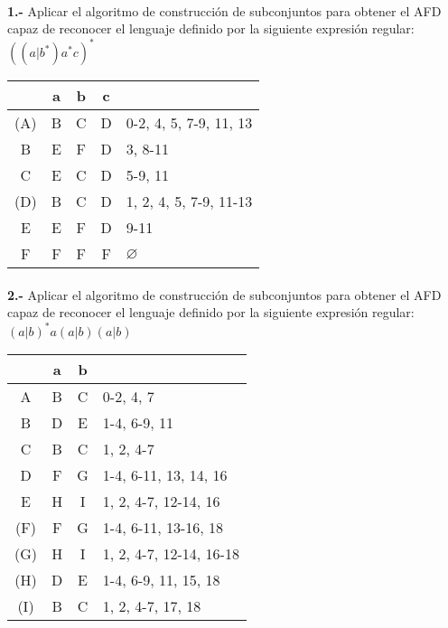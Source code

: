 \documentclass[11pt,a4paper]{report}
\begin{document}
\paragraph{}

\paragraph{}
\textbf{1.-} Aplicar el algoritmo de construcción de subconjuntos para obtener el AFD capaz de reconocer el lenguaje definido por la siguiente expresión regular: \textbf{$ ((a|b^*)a^*c)^* $} \\

\begin{tabular} {| c | c |c |c | l |}
\hline 
& a & b & c & \\ \hline
(A) & B & C & D & 0-2, 4, 5, 7-9, 11, 13\\ \hline
B & E & F & D & 3, 8-11\\ \hline
C & E & C & D & 5-9, 11\\ \hline
(D) & B & C & D & 1, 2, 4, 5, 7-9, 11-13\\ \hline
E & E & F & D & 9-11\\ \hline
F & F & F & F & $\varnothing$\\ \hline
\end{tabular}\paragraph{}
\textbf{2.-} Aplicar el algoritmo de construcción de subconjuntos para obtener el AFD capaz de reconocer el lenguaje definido por la siguiente expresión regular: \textbf{$ (a|b)^*a(a|b)(a|b) $} \\

\begin{tabular} {| c | c |c | l |}
\hline 
& a & b & \\ \hline
A & B & C & 0-2, 4, 7\\ \hline
B & D & E & 1-4, 6-9, 11\\ \hline
C & B & C & 1, 2, 4-7\\ \hline
D & F & G & 1-4, 6-11, 13, 14, 16\\ \hline
E & H & I & 1, 2, 4-7, 12-14, 16\\ \hline
(F) & F & G & 1-4, 6-11, 13-16, 18\\ \hline
(G) & H & I & 1, 2, 4-7, 12-14, 16-18\\ \hline
(H) & D & E & 1-4, 6-9, 11, 15, 18\\ \hline
(I) & B & C & 1, 2, 4-7, 17, 18\\ \hline
\end{tabular}
\end{document}
